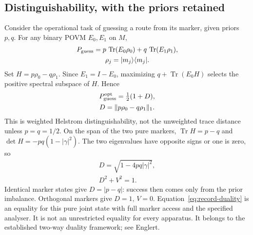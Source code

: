 \subsection{Distinguishability, with the priors retained}
Consider the operational task of guessing a route from its marker, given priors $p,q$. For any binary POVM $E_0,E_1$ on $M$,
\begin{equation}
\begin{gathered}
P_{\rm guess}=p\,\operatorname{Tr}(E_0\rho_0)
          +q\,\operatorname{Tr}(E_1\rho_1),
 \\
 \rho_j=|m_j\rangle\langle m_j|.
\end{gathered}
\end{equation}
Set $H=p\rho_0-q\rho_1$. Since $E_1=I-E_0$,
maximizing $q+\operatorname{Tr}(E_0H)$ selects the positive spectral subspace of $H$. Hence
\begin{equation}
\begin{gathered}
P_{\rm guess}^{\rm opt}=\tfrac12(1+D),
 \\
 D=\|p\rho_0-q\rho_1\|_1 .
\end{gathered}
\label{eq:weighted-helstrom}
\end{equation}
This is weighted Helstrom distinguishability,\cite{BarnettCroke2009} not the unweighted trace distance unless $p=q=1/2$. On the span of the two pure markers, $\operatorname{Tr}H=p-q$ and
$\det H=-pq(1-|\gamma|^2)$. The two eigenvalues have opposite signs or one is zero, so
\begin{equation}
\begin{gathered}
D=\sqrt{1-4pq|\gamma|^2},\\
 D^2+V^2=1.
\end{gathered}
\label{eq:record-duality}
\end{equation}
Identical marker states give $D=|p-q|$: success then comes only from the prior imbalance. Orthogonal markers give $D=1$, $V=0$. Equation~\eqref{eq:record-duality} is an equality for this pure joint state with full marker access and the specified analyser. It is not an unrestricted equality for every apparatus. It belongs to the established two-way duality framework; see Englert.\cite{Englert1996}

